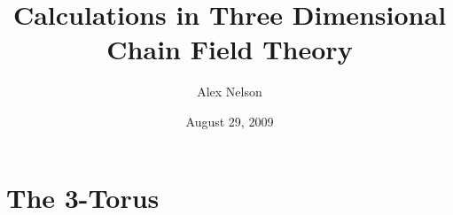 \documentclass{amsart}
\title{Calculations in Three Dimensional Chain Field Theory}
\date{August 29, 2009}
\author{Alex Nelson}
\begin{document}
\maketitle

\section{The 3-Torus}


\nocite{*}


\end{document}
